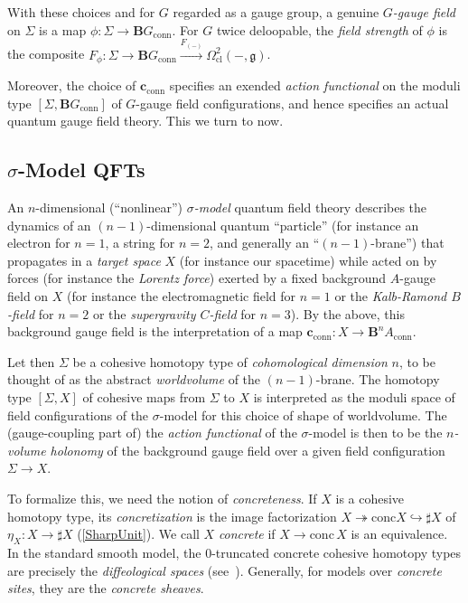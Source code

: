 \documentclass[copyright]{eptcs}
\begin{document}
With these choices and
for $G$ regarded as a gauge group, a genuine \emph{$G$-gauge field} on $\Sigma$ is a map
$\phi : \Sigma \to \mathbf{B}G_{\mathrm{conn}}$. For $G$ twice deloopable, the \emph{field strength}
of $\phi$ is the
composite
$F_{\phi} : \Sigma \to \mathbf{B}G_{\mathrm{conn}} \xrightarrow{F_{(-)}} \Omega^2_{\mathrm{cl}}(-,\mathfrak{g})$.

Moreover, the choice of $\mathbf{c}_{\mathrm{conn}}$ specifies an exended \emph{action functional}
on the moduli type $[\Sigma, \mathbf{B}G_{\mathrm{conn}}]$ of $G$-gauge field configurations, and hence
specifies an actual quantum gauge field theory. This we turn to now.


\subsection{$\sigma$-Model QFTs}


An $n$-dimensional (``nonlinear'')
\emph{$\sigma$-model} quantum field theory describes the dynamics of an $(n-1)$-dimensional
quantum ``particle'' (for instance an electron for $n = 1$, a string  for $n = 2$, and generally
an ``$(n-1)$-brane'') that propagates in a \emph{target space} $X$
(for instance our spacetime) while acted on by forces (for instance the \emph{Lorentz force})
exerted by a fixed background $A$-gauge field on $X$
(for instance the electromagnetic field for $n = 1$ or the \emph{Kalb-Ramond $B$-field} for $n = 2$
or the \emph{supergravity $C$-field} for $n = 3$).
By the above, this background gauge field is the interpretation of a map
$
  \mathbf{c}_{\mathrm{conn}}
    : X \to  \mathbf{B}^n A_{\mathrm{conn}}
$.

Let then $\Sigma$ be a cohesive homotopy type of \emph{cohomological dimension} $n$,
to be thought of as the abstract \emph{worldvolume} of the $(n-1)$-brane.
The homotopy type $[\Sigma,X]$ of cohesive
maps from $\Sigma$ to $X$ is interpreted as the moduli space of field configurations of the
$\sigma$-model for this choice of shape of worldvolume.
The (gauge-coupling part of) the \emph{action functional} of the $\sigma$-model is
then to be the \emph{$n$-volume holonomy} of the background gauge field over a given
field configuration $\Sigma \to X$.

To formalize this, we need the notion of \emph{concreteness}.
If $X$ is a cohesive homotopy type, its \emph{concretization} is the image factorization
$X \twoheadrightarrow \mathrm{conc} X \hookrightarrow \sharp X$
of $\eta_X:X\to \sharp X$ (\ref{SharpUnit}).
We call $X$ \emph{concrete} if $X \to \mathrm{conc}\,X$ is an equivalence.
In the standard smooth model, the 0-truncated concrete
cohesive homotopy types are precisely the \emph{diffeological spaces} (see~\cite{SmoothSpaces}).
Generally, for models over \emph{concrete sites}, they are the \emph{concrete sheaves}.
\end{document}
